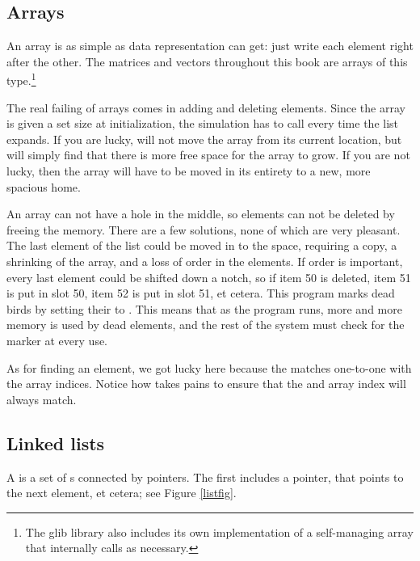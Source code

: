 \subsection{Arrays} An array is as simple as data representation can
get: just write each element right after the other. The matrices
and vectors throughout this book are arrays of this type.\footnote{The glib
library also includes its own implementation of a self-managing array
that internally calls  as necessary.}

The real failing of arrays comes in adding and deleting elements. Since
the array is given a set size at initialization,
the simulation has to call  every time the
list expands. If you are lucky,  will not move the array
from its current location, but will simply find that there is more free
space for the array to grow. If you are not lucky, then the array will
have to be moved in its entirety to a new, more spacious home.

An array can not have a hole in the middle, so elements can not be
deleted by freeing the memory. There are a few solutions, none of which
are very pleasant. The last element of the list could be moved in to the
space, requiring a copy, a shrinking of the array, and a loss of order
in the elements. If order is important, every last element could be
shifted down a notch, so if item 50 is deleted, item 51 is put in slot
50, item 52 is put in slot 51, et cetera. This program marks dead birds
by setting their  to . This means that as the program runs,
more and more memory is used by dead elements, and the rest of the system
must check for the marker at every use.

As for finding an element, we got lucky here because the  
matches one-to-one with the array indices. Notice how
 takes pains to ensure that the  and array
index will always match.


\subsection{Linked lists} A  is a set of s connected
by pointers. The first  includes a  pointer, that
points to the next element, et cetera; see Figure \ref{listfig}.

